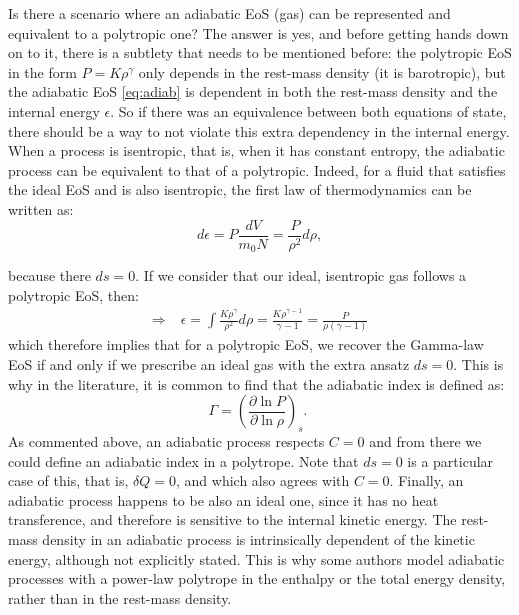 \documentclass[12pt]{report}
\newcommand\red[1]{\textcolor{red}{#1}}
\begin{document}
	Is there a scenario where an adiabatic EoS (gas) can be represented and equivalent to a polytropic one? The answer is yes, and before getting hands down on to it, there is a subtlety that needs to be mentioned before: the polytropic EoS in the form $P=K\rho^\gamma$ only depends in the rest-mass density (it is barotropic), but the adiabatic EoS \red{\ref{eq:adiab}} is dependent in both the rest-mass density and the internal energy $\epsilon$. So if there was an equivalence between both equations of state, there should be a way to not violate this extra dependency in the internal energy.\\
	
	When a process is isentropic, that is, when it has constant entropy, the adiabatic process can be equivalent to that of a polytropic. Indeed, for a fluid that satisfies the ideal EoS and is also isentropic, the first law of thermodynamics can be written as:
	\begin{equation}
		d\epsilon= P\dfrac{dV}{m_0N} =\frac{P}{\rho^2}d\rho, 
	\end{equation} 
	
	because there $ds = 0$. If we consider that our ideal, isentropic gas follows a polytropic EoS, then:
	\begin{align} 
		\Rightarrow &\;\epsilon = \int \frac{K\rho^\gamma}{\rho^2}d\rho = \frac{K\rho^{\gamma-1}}{\gamma-1} = \frac{P}{\rho(\gamma-1)}
	\end{align}
	which therefore implies that for a polytropic EoS, we recover the Gamma-law EoS if and only if we prescribe an ideal gas with the extra ansatz $ds=0$. This is why in the literature, it is common to find that the adiabatic index is defined as:
	\begin{equation}
		\boxed{\Gamma = \left(\frac{\partial \ln P}{\partial \ln \rho}\right)_s.\;}
	\end{equation}
	As commented above, an adiabatic process respects $C=0$ and from there we could define an adiabatic index in a polytrope. Note that $ds=0$ is a particular case of this, that is, $\delta Q=0$, and which also agrees with $C=0$. Finally, an adiabatic process happens to be also an ideal one, since it has no heat transference, and therefore is sensitive to the internal kinetic energy. The rest-mass density in an adiabatic process is intrinsically dependent of the kinetic energy, although not explicitly stated. This is why some authors model adiabatic processes with a power-law polytrope in the enthalpy or the total energy density, rather than in the rest-mass density.
\end{document}

